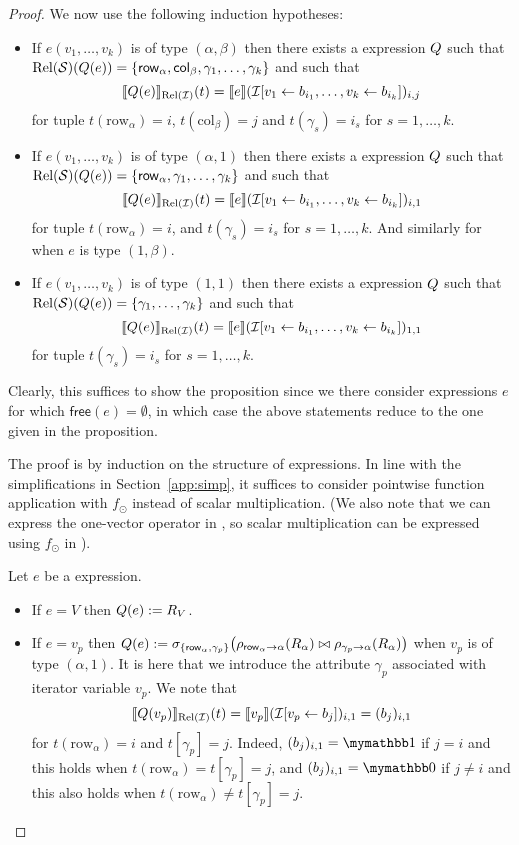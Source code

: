 \begin{proof}
We now use the following induction hypotheses:
\begin{itemize}
	\item If $e(v_1,\ldots,v_k)$ is of type $(\alpha,\beta)$ then there exists a
	\rak expression $Q$ such that $\text{Rel}(\mathcal{S})(Q(e))=\{\mathsf{row}_\alpha,\mathsf{col}_\beta,\gamma_1,\ldots,\gamma_k\}$
	and such that 
	$$
	\llbracket Q(e) \rrbracket_{\text{Rel}(\mathcal{I})}(t)=\llbracket e \rrbracket(\mathcal{I}[v_1\gets b_{i_1},\ldots,v_k\gets b_{i_k}])_{i,j}
	$$
	for tuple $t(\mathrm{row}_\alpha)=i$, $t(\mathrm{col}_\beta)=j$ and $t(\gamma_s)=i_s$ for $s=1,\ldots, k$.
	\item If $e(v_1,\ldots,v_k)$ is of type $(\alpha,1)$ then there exists a
	\rak expression $Q$ such that $\text{Rel}(\mathcal{S})(Q(e))=\{\mathsf{row}_\alpha,\gamma_1,\ldots,\gamma_k\}$
	and such that 
	$$
	\llbracket Q(e) \rrbracket_{\text{Rel}(\mathcal{I})}(t)=\llbracket e \rrbracket(\mathcal{I}[v_1\gets b_{i_1},\ldots,v_k\gets b_{i_k}])_{i,1}
	$$
	for tuple $t(\mathrm{row}_\alpha)=i$,  and $t(\gamma_s)=i_s$ for $s=1,\ldots, k$.
	And similarly for when $e$ is type $(1,\beta)$.
	\item If $e(v_1,\ldots,v_k)$ is of type $(1,1)$ then there exists a
	\rak expression $Q$ such that $\text{Rel}(\mathcal{S})(Q(e))=\{\gamma_1,\ldots,\gamma_k\}$
	and such that 
	$$
	\llbracket Q(e) \rrbracket_{\text{Rel}(\mathcal{I})}(t)=\llbracket e \rrbracket(\mathcal{I}[v_1\gets b_{i_1},\ldots,v_k\gets b_{i_k}])_{1,1}
	$$
	for tuple $t(\gamma_s)=i_s$ for $s=1,\ldots, k$.
\end{itemize}
Clearly, this suffices to show the proposition since we there consider expressions $e$ for which $\mathsf{free}(e)=\emptyset$, in which case the above statements reduce to the one given in the proposition.


The proof is by induction on the structure of \langsum expressions. In line with the simplifications in Section~\ref{app:simp}, it suffices to consider pointwise function application with $f_\odot$ instead of scalar multiplication. (We also note that we can express the one-vector operator in \langsum, so scalar multiplication can be expressed using $f_\odot$ in \langsum).

Let $e$ be a \langsum expression.
\begin{itemize}
  \item If $e=V$ then $Q (e):=R_V$.
  \item If $e=v_p$ then $Q (e):=\sigma_{\lbrace \mathsf{row}_\alpha,\gamma_p\rbrace}\bigl(\rho_{\mathsf{row}_\alpha\to \alpha}(R_\alpha)\bowtie \rho_{\gamma_p\to \alpha}(R_\alpha)\bigr)$ when  $v_p$ is of type $(\alpha,1)$. It is here that we introduce the attribute $\gamma_p$ associated with iterator variable $v_p$.
 We note that 
$$ \llbracket Q(v_p) \rrbracket_{\text{Rel}(\mathcal{I})}(t)=\llbracket v_p \rrbracket(\mathcal{I}[v_p\gets b_{j}])_{i,1}=(b_j)_{i,1}
$$
for $t(\mathrm{row}_\alpha)=i$ and $t[\gamma_p]=j$. Indeed, $(b_j)_{i,1}=\kone$ if $j=i$
and this holds when $t(\mathrm{row}_\alpha)=t[\gamma_p]=j$, and $(b_j)_{i,1}=\kzero$ if $j\neq i$
and this also holds when $t(\mathrm{row}_\alpha)\neq t[\gamma_p]=j$.


\end{itemize}
\end{proof}

